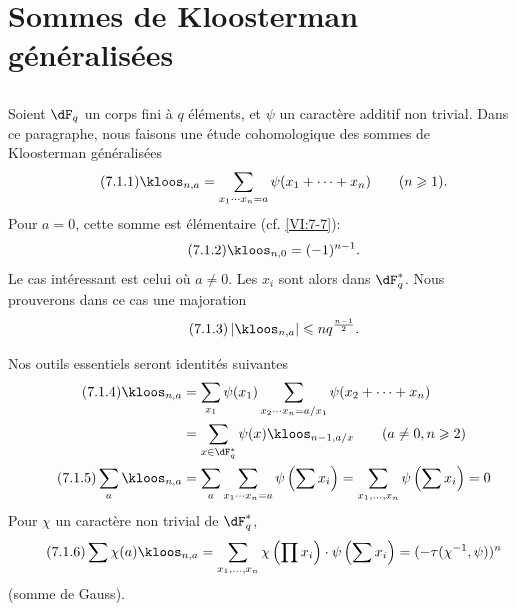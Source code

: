 \section{Sommes de Kloosterman généralisées}\label{VI:7}





\subsection{}\label{VI:7-1}

Soient $\dF_q$ un corps fini à $q$ éléments, et $\psi$ un caractère 
additif non trivial. Dans ce paragraphe, nous faisons une étude cohomologique 
des sommes de Kloosterman généralisées 
\begin{equation*}\tag{7.1.1}\label{VI:eq:7-1-1}
  \kloos_{n,a} = \sum_{x_1\dotsm x_n = a} \psi(x_1+\cdots + x_n) \qquad (n\geqslant 1) \text{.} 
\end{equation*}
Pour $a=0$, cette somme est élémentaire (cf. \ref{VI:7-7}): 
\begin{equation*}\tag{7.1.2}\label{VI:eq:7-1-2}
  \kloos_{n,0} = (-1)^{n-1} \text{.} 
\end{equation*}
Le cas intéressant est celui où $a\ne 0$. Les $x_i$ sont alors dans 
$\dF_q^\ast$. Nous prouverons dans ce cas une majoration 
\begin{equation*}\tag{7.1.3}\label{VI:eq:7-1-3}
  \left|\kloos_{n,a}\right| \leqslant n q^{\frac{n-1}{2}} \text{.} 
\end{equation*}

Nos outils essentiels seront  
identités suivantes 
\begin{align*}\tag{7.1.4}\label{VI:eq:7-1-4}
  \kloos_{n,a} &= \sum_{x_1} \psi(x_1) \sum_{x_2\dotsm x_n = a/x_1} \psi(x_2+\cdots + x_n) \\ \notag
    &= \sum_{x\in \dF_q^\ast} \psi(x) \kloos_{n-1,a/x} \qquad (a\ne 0,n\geqslant 2) \\ \tag{7.1.5}\label{VI:eq:7-1-5}
  \sum_a \kloos_{n,a} &= \sum_a \sum_{x_1 \dotsm x_n = a} \psi\left(\sum x_i\right) = \sum_{x_1,\dots,x_n} \psi\left(\sum x_i\right) = 0 
\end{align*}
Pour $\chi$ un caractère non trivial de $\dF_q^\ast$, 
\begin{equation*}\tag{7.1.6}\label{VI:eq:7-1-6}
  \sum \chi(a) \kloos_{n,a} = \sum_{x_1,\dots,x_n} \chi\left(\prod x_i\right) \cdot \psi\left(\sum x_i\right) = (-\tau(\chi^{-1},\psi))^n 
\end{equation*}
(somme de Gauss). 





